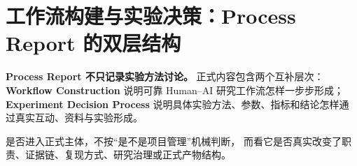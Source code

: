 \documentclass[11pt,a4paper]{article}
\begin{document}
\hypersetup{pageanchor=true}

\tableofcontents
\clearpage


\section{工作流构建与实验决策：Process Report 的双层结构}

\begin{contextbox}
\textbf{Process Report 不只记录实验方法讨论。}
正式内容包含两个互补层次：
\textbf{Workflow Construction}
说明可靠 Human--AI 研究工作流怎样一步步形成；
\textbf{Experiment Decision Process}
说明具体实验方法、参数、指标和结论怎样通过真实互动、资料与实验形成。

是否进入正式主体，不按“是不是项目管理”机械判断，
而看它是否真实改变了职责、证据链、复现方式、研究治理或正式产物结构。
\end{contextbox}

\vspace{0.7em}
\end{document}
